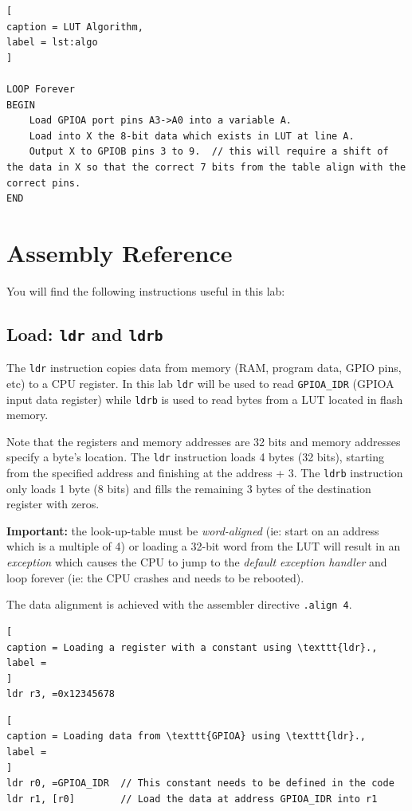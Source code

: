 \documentclass{UoNMCHA}
\numberwithin{equation}{section}
\begin{document}
\begin{lstlisting}[
caption = LUT Algorithm,
label = lst:algo
]

LOOP Forever
BEGIN
    Load GPIOA port pins A3->A0 into a variable A.
    Load into X the 8-bit data which exists in LUT at line A.
    Output X to GPIOB pins 3 to 9.  // this will require a shift of the data in X so that the correct 7 bits from the table align with the correct pins.
END
\end{lstlisting}

\section{Assembly Reference}\label{sec:asm}

You will find the following instructions useful in this lab:

\subsection{Load: \texttt{ldr} and \texttt{ldrb}}

The \texttt{ldr} instruction copies data from memory (RAM, program data, GPIO pins, etc) to a CPU register. In this lab \texttt{ldr} will be used to read \texttt{GPIOA\_IDR} (GPIOA input data register) while \texttt{ldrb} is used to read bytes from a LUT located in flash memory.

Note that the registers and memory addresses are 32 bits and memory addresses specify a byte's location. The \texttt{ldr} instruction loads 4 bytes (32 bits), starting from the specified address and finishing at the address + 3. The \texttt{ldrb} instruction only loads 1 byte (8 bits) and fills the remaining 3 bytes of the destination register with zeros.

\textbf{Important:} the look-up-table must be \textit{word-aligned} (ie: start on an address which is a multiple of 4) or loading a 32-bit word from the LUT will result in an \textit{exception} which causes the CPU to jump to the \textit{default exception handler} and loop forever (ie: the CPU crashes and needs to be rebooted).

The data alignment is achieved with the assembler directive \texttt{.align 4}.

\begin{lstlisting}[
caption = Loading a register with a constant using \texttt{ldr}.,
label = 
]
ldr r3, =0x12345678
\end{lstlisting}

\begin{lstlisting}[
caption = Loading data from \texttt{GPIOA} using \texttt{ldr}.,
label = 
]
ldr r0, =GPIOA_IDR  // This constant needs to be defined in the code
ldr r1, [r0]        // Load the data at address GPIOA_IDR into r1
\end{lstlisting}
\end{document}
